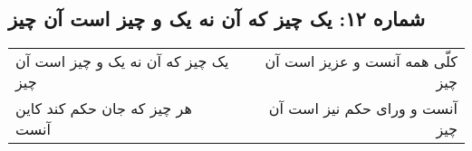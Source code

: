 \begin{center}
\section*{شماره ۱۲: یک چیز که آن نه یک و چیز است آن چیز}
\label{sec:012}
\begin{longtable}{l p{0.5cm} r}
یک چیز که آن نه یک و چیز است آن چیز
&&
کلّی همه آنست و عزیز است آن چیز
\\
هر چیز که جان حکم کند کاین آنست
&&
آنست و ورای حکم نیز است آن چیز
\\
\end{longtable}
\end{center}
